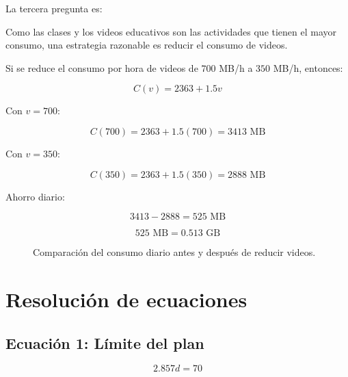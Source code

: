 \documentclass[12pt,a4paper]{article}
\begin{document}
\begin{center}
		La tercera pregunta es:
		
		\begin{quote}
		\end{quote}
		
		Como las clases y los videos educativos son las actividades que tienen el mayor consumo, una estrategia razonable es reducir el consumo de videos.
		
		Si se reduce el consumo por hora de videos de $700$ MB/h a $350$ MB/h, entonces:
		
		\[
		C(v)=2363+1.5v
		\]
		
		Con $v=700$:
		
		\[
		C(700)=2363+1.5(700)=3413\text{ MB}
		\]
		
		Con $v=350$:
		
		\[
		C(350)=2363+1.5(350)=2888\text{ MB}
		\]
		
		Ahorro diario:
		
		\[
		3413-2888=525\text{ MB}
		\]
		
		\[
		525\text{ MB}=0.513\text{ GB}
		\]
		
		\begin{figure}[H]
			\centering
			\caption{Comparación del consumo diario antes y después de reducir videos.}
		\end{figure}
		
		\section{Resolución de ecuaciones}
		
		\subsection{Ecuación 1: Límite del plan}
		
		\[
		2.857d=70
		\]
		

\end{center}
\end{document}
